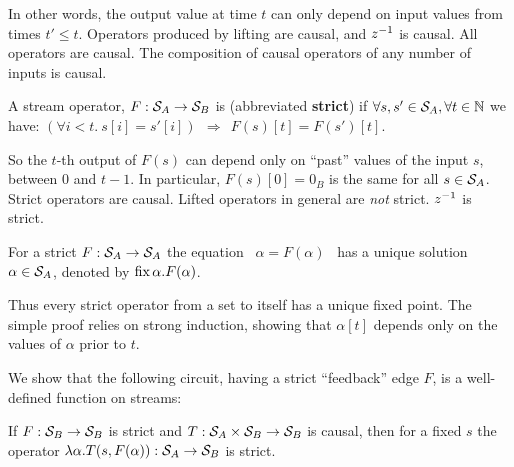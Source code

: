 \noindent
In other words, the output value at time $t$ can only depend on 
input values from times $t' \leq t$.
Operators produced by lifting are causal, and $z^{-1}$ is causal.
All \dbsp operators are causal.  The composition
of causal operators of any number of inputs is causal.

\begin{definition}[Strictness]
A stream operator, $F:\mathcal{S}_{A}\to\mathcal{S}_{B}$ 
is  (abbreviated \textbf{strict})
if  $\forall s,s'\in\mathcal{S}_{A}, \forall t \in \mathbb{N}$ we have:
$(\forall i<t . ~s[i]=s'[i]) ~~\Rightarrow~~ F(s)[t]=F(s')[t].$
\end{definition}

So the $t$-th output of $F(s)$ can depend only on ``past'' values
of the input $s$, between $0$ and $t-1$.  
In particular, $F(s)[0] = 0_B$ is the same for all $s \in \mathcal{S}_{A}$.
Strict operators are causal. Lifted operators in general are \emph{not} strict. 
$z^{-1}$ is strict.  %

\begin{proposition}
\label{prop-unique-fix}
For a strict $F: \mathcal{S}_{A} \to \mathcal{S}_{A}$ the equation ~$\alpha=F(\alpha)$~ has a unique
solution $\alpha \in \mathcal{S}_{A}$, denoted by $\mbox{fix}\,\alpha.F(\alpha)$. 
\end{proposition}

Thus every strict operator from a set to itself has a unique fixed point.
The simple proof relies on strong induction, showing that $\alpha[t]$ 
depends only on the values of $\alpha$ prior to $t$.  

We show that the following circuit, having a strict ``feedback'' edge $F$,
is a well-defined function on streams:

\begin{center}
\end{center}

\begin{lemma} 
\label{lemma-causal-strict}
If $F: \mathcal{S}_{B} \to \mathcal{S}_{B}$ is strict and $T: \mathcal{S}_{A} \times \mathcal{S}_{B} \to \mathcal{S}_{B}$ is causal, then for a fixed $s$ the operator
$\lambda\alpha.T(s,F(\alpha)): \mathcal{S}_{A} \to \mathcal{S}_{B}$ is strict. 
\end{lemma}

